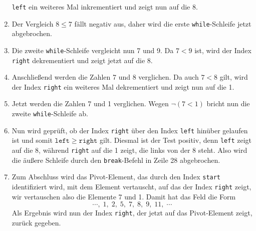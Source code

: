 \begin{enumerate}
      \texttt{left} ein weiteres Mal inkrementiert und zeigt nun auf die 8.
\item Der Vergleich $8 \leq 7$ f\"allt negativ aus, daher wird die erste
      \texttt{while}-Schleife jetzt abgebrochen.
\item Die zweite \texttt{while}-Schleife vergleicht nun 7 und 9.  Da $7 < 9$ ist,
      wird der Index \texttt{right} dekrementiert und zeigt jetzt auf die 8.
\item Anschlie{\ss}end werden die Zahlen 7 und 8 verglichen.  Da auch $7 < 8$ gilt, wird der
      Index \texttt{right} ein weiteres Mal dekrementiert und zeigt nun auf die 1.
\item Jetzt werden die Zahlen 7 und 1 verglichen.  Wegen $\neg (7 < 1)$ bricht nun die
      zweite \texttt{while}-Schleife ab.
\item Nun wird gepr\"uft, ob der Index \texttt{right} \"uber den Index
      \texttt{left} hin\"uber gelaufen ist und somit $\mathtt{left} \geq \mathtt{right}$
      gilt.  Diesmal ist der Test positiv, denn \texttt{left} zeigt auf die 8,
      w\"ahrend \texttt{right} auf die 1 zeigt, die links von der 8 steht.
      Also wird die \"au{\ss}ere Schleife durch den \texttt{break}-Befehl in Zeile 28
      abgebrochen.
\item Zum Abschluss wird das Pivot-Element, das durch den Index \texttt{start}
      identifiziert wird, mit dem Element vertauscht, auf das der Index \texttt{right}
      zeigt,  wir vertauschen also die Elemente 7 und 1.  Damit hat das Feld die Form
      \[ \cdots,\; 1,\; 2,\; 5,\; 7,\; 8,\; 9,\; 11,\;\cdots \]
      Als Ergebnis wird nun der Index \texttt{right}, der jetzt auf das Pivot-Element
      zeigt, zur\"uck gegeben.
\end{enumerate}
 
